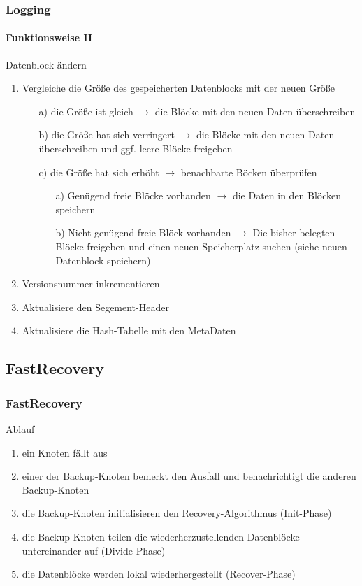 \documentclass{beamer}
\begin{document}
		\begin{frame}
			\frametitle{Logging}
			\framesubtitle{Funktionsweise II}

			\begin{block}{Datenblock ändern}
				\begin{enumerate}
					\item Vergleiche die Größe des gespeicherten Datenblocks mit der neuen Größe
						\begin{enumerate}
							\item[a)] die Größe ist gleich $\rightarrow$ die Blöcke mit den neuen Daten überschreiben
							\item[b)] die Größe hat sich verringert $\rightarrow$ die Blöcke mit den neuen Daten überschreiben und ggf. leere Blöcke freigeben
							\item[c)] die Größe hat sich erhöht $\rightarrow$ benachbarte Böcken überprüfen
								\begin{enumerate}
									\item[a)] Genügend freie Blöcke vorhanden $\rightarrow$ die Daten in den Blöcken speichern
									\item[b)] Nicht genügend freie Blöck vorhanden $\rightarrow$ Die bisher belegten Blöcke freigeben und einen neuen Speicherplatz suchen (siehe neuen Datenblock speichern)
								\end{enumerate}
						\end{enumerate}
					\item Versionsnummer inkrementieren
					\item Aktualisiere den Segement-Header
					\item Aktualisiere die Hash-Tabelle mit den MetaDaten
				\end{enumerate}
			\end{block}
		\end{frame}

	\subsection{FastRecovery}

		\begin{frame}
			\frametitle{FastRecovery}

			\begin{block}{Ablauf}
				\begin{enumerate}
					\item ein Knoten fällt aus
					\item einer der Backup-Knoten bemerkt den Ausfall und benachrichtigt die anderen Backup-Knoten
					\item die Backup-Knoten initialisieren den Recovery-Algorithmus (Init-Phase)
					\item die Backup-Knoten teilen die wiederherzustellenden Datenblöcke untereinander auf (Divide-Phase)
					\item die Datenblöcke werden lokal wiederhergestellt (Recover-Phase)
				\end{enumerate}
			\end{block}
		\end{frame}
\end{document}
